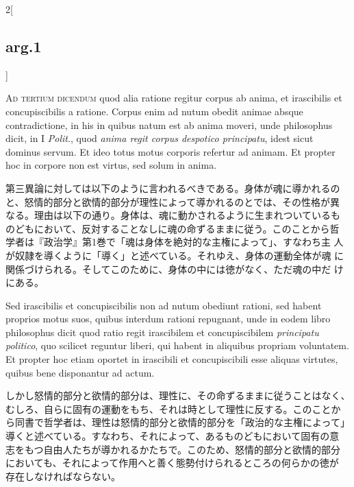 \documentclass[paper=a4paper,fontsize=10pt,jafontsize=9pt,titlepage]{jlreq}
\begin{document}
\begin{paracol}{2}[\subsection{arg.1}]
\switchcolumn*[\subsection{ad.3}]

{\scshape Ad tertium dicendum} quod alia ratione regitur corpus ab
anima, et irascibilis et concupiscibilis a ratione. Corpus enim ad
nutum obedit animae absque contradictione, in his in quibus natum est
ab anima moveri, unde philosophus dicit, in I {\itshape Polit}., quod
{\itshape anima regit corpus despotico principatu}, idest sicut
dominus servum. Et ideo totus motus corporis refertur ad animam. Et
propter hoc in corpore non est virtus, sed solum in anima.

\switchcolumn

第三異論に対しては以下のように言われるべきである。身体が魂に導かれるの
と、怒情的部分と欲情的部分が理性によって導かれるのとでは、その性格が異
なる。理由は以下の通り。身体は、魂に動かされるように生まれついているも
のどもにおいて、反対することなしに魂の命ずるままに従う。このことから哲
学者は『政治学』第1巻で「魂は身体を絶対的な主権によって」、すなわち主
人が奴隷を導くように「導く」と述べている。それゆえ、身体の運動全体が魂
に関係づけられる。そしてこのために、身体の中には徳がなく、ただ魂の中だ
けにある。

\switchcolumn*

Sed
irascibilis et concupiscibilis non ad nutum obediunt rationi, sed
habent proprios motus suos, quibus interdum rationi repugnant, unde in
eodem libro philosophus dicit quod ratio regit irascibilem et
concupiscibilem {\itshape principatu politico}, quo scilicet reguntur
liberi, qui habent in aliquibus propriam voluntatem. Et propter hoc
etiam oportet in irascibili et concupiscibili esse aliquas virtutes,
quibus bene disponantur ad actum.

\switchcolumn

しかし怒情的部分と欲情的部分は、理性に、その命ずるままに従うことはなく、
むしろ、自らに固有の運動をもち、それは時として理性に反する。このことか
ら同書で哲学者は、理性は怒情的部分と欲情的部分を「政治的な主権によって」
導くと述べている。すなわち、それによって、あるものどもにおいて固有の意
志をもつ自由人たちが導かれるかたちで。このため、怒情的部分と欲情的部分
においても、それによって作用へと善く態勢付けられるところの何らかの徳が
存在しなければならない。

\switchcolumn*[\subsection{ad.4}]


\end{paracol}
\end{document}
